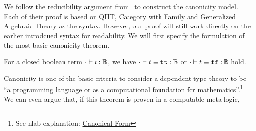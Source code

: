 We follow the reducibility argument from~\cite{kaposi2019gluing, coquand2018canonicity,sterling2019algebraic} to construct the canonicity model.
Each of their proof is based on QIIT, Category with Family\cite{dybjer1995internal} and Generalized Algebraic Theory \cite{cartmell1986generalised} as the syntax. However, our proof will still work directly on the earlier introdcued syntax for readability.
We will first specify the formulation of the most basic canonicity theorem. 

\begin{theorem}[Canonicity]
  For a closed boolean term $ {\cdot} \vdash {t} : {\mathbb{B}} $, we have $ {\cdot} \vdash {t \equiv \ensuremath{\texttt{tt}}} : {\mathbb{B}} $ or $ {\cdot} \vdash {t \equiv \ensuremath{\texttt{ff}}} : {\mathbb{B}} $ hold.
\end{theorem}

Canonicity is one of the basic criteria to consider a dependent type theory to be ``a programming language or as a computational foundation for mathematics''.\footnote{See nlab explanation: \href{https://ncatlab.org/nlab/show/canonical+form}{Canonical Form}}
We can even argue that, if this theorem is proven in a computable meta-logic, 
